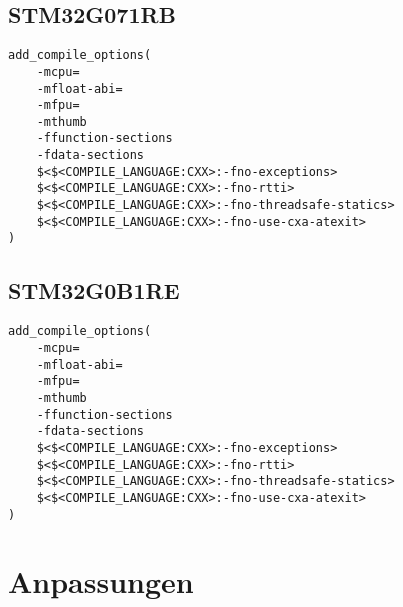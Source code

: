 \subsection{STM32G071RB}
\begin{lstlisting}
add_compile_options(
	-mcpu=
	-mfloat-abi=
	-mfpu=
	-mthumb
	-ffunction-sections
	-fdata-sections
	$<$<COMPILE_LANGUAGE:CXX>:-fno-exceptions>
	$<$<COMPILE_LANGUAGE:CXX>:-fno-rtti>
	$<$<COMPILE_LANGUAGE:CXX>:-fno-threadsafe-statics>
	$<$<COMPILE_LANGUAGE:CXX>:-fno-use-cxa-atexit>
)
\end{lstlisting}


\subsection{STM32G0B1RE}
\begin{lstlisting}
add_compile_options(
	-mcpu=
	-mfloat-abi=
	-mfpu=
	-mthumb
	-ffunction-sections
	-fdata-sections
	$<$<COMPILE_LANGUAGE:CXX>:-fno-exceptions>
	$<$<COMPILE_LANGUAGE:CXX>:-fno-rtti>
	$<$<COMPILE_LANGUAGE:CXX>:-fno-threadsafe-statics>
	$<$<COMPILE_LANGUAGE:CXX>:-fno-use-cxa-atexit>
)
\end{lstlisting}

\section{Anpassungen}
































